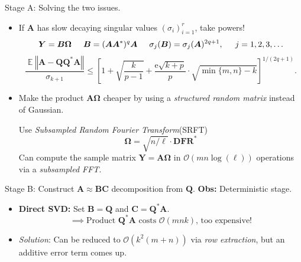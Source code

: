 \documentclass{beamer}
\newcommand{\Expect}{\operatorname{\mathbb{E}}}
\newcommand{\norm}[1]{\left\Vert {#1} \right\Vert}
\newcommand{\mtx}[1]{\bm{#1}}
\newcommand{\adj}{*}
\newcommand{\econst}{\mathrm{e}}
\begin{document}
\begin{frame}{Stage A: Solving the two issues.}
\begin{itemize}
  \item If $\mtx{A}$ has slow decaying singular values $(\sigma_i)_{i=1}^r$, take powers!\bcsmbh
  $$ \mtx{Y}=\mtx{B}\mtx{\Omega}\hspace{0.5cm}\mtx{B}=(\mtx{A}\mtx{A}^\adj)^q\mtx{A} \hspace{0.5cm} \sigma_j(\mtx{B}) = \sigma_j(\mtx{A})^{2q+1},
      \hspace{0.5cm} j=1,2,3,\ldots$$
      $$ \frac{\Expect \norm{\mtx{A}-\mtx{Q}\mtx{Q}^\adj\mtx{A}}}{\sigma_{k+1}}
    \leq \left[ 1 + \sqrt{\frac{k}{p-1}}
    + \frac{\econst\sqrt{k+p}}{p} \cdot \sqrt{ \min\{m,n\} - k } \right]^{1/(2q+1)}
    . $$

  \item Make the product $\mtx{A}\mtx{\Omega}$ cheaper by using a 
  \textit{structured random matrix} instead of Gaussian. 

  Use \textit{Subsampled Random Fourier Transform}(SRFT)
  $$ \mtx{\Omega} = \sqrt{n/\ell} \cdot \mtx{DFR}^\adj $$
  Can compute the sample
matrix $\mtx{Y} = \mtx{A\Omega}$ in $\mathcal{O}(mn\log(\ell))$ operations via a
\textit{subsampled FFT}. \bcsmbh
\end{itemize}
\end{frame}

\begin{frame}{Stage B: Construct $\mtx{A}\approx\mtx{B}\mtx{C}$ decomposition from $\mtx{Q}$.}
\textbf{Obs:} Deterministic stage.
\begin{itemize}
  \item \textbf{Direct SVD:} Set $\mtx{B}=\mtx{Q}$ and $\mtx{C}=\mtx{Q}^\adj\mtx{A}$.
  $$ \implies \text{Product }\mtx{Q}^\adj\mtx{A}\text{ costs }
  \mathcal{O}(mnk)\text{, too expensive!} $$

  \item \textit{Solution}: Can be reduced to $\mathcal{O}(k^2(m+n))$
  via \textit{row extraction}, but an additive error term comes up.
\end{itemize}
\end{frame}
\end{document}

